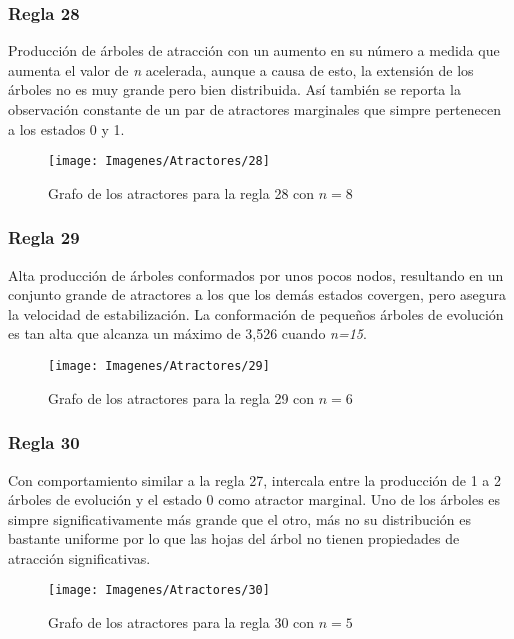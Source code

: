 \documentclass[]{article}
\begin{document}
			
			\newpage
			\subsubsection{Regla 28}
				\justifying	
				Producción de árboles de atracción con un aumento en su número a medida que aumenta el valor de \textit{n} acelerada, aunque a causa de esto, la extensión de los árboles no es muy grande pero bien distribuida. Así también se reporta la observación constante de un par de atractores marginales que simpre pertenecen a los estados 0 y 1.
				
				\hfill\break
				\hfill\break
				\hfill\break
				\begin{figure}[!h]
					\centering
					\texttt{[image: Imagenes/Atractores/28]}
					\caption{Grafo de los atractores para la regla 28 con $n=8$}
					\label{Regla_28}
				\end{figure}
	
			
			\newpage
			\subsubsection{Regla 29}
				\justifying	
				Alta producción de árboles conformados por unos pocos nodos, resultando en un conjunto grande de atractores a los que los demás estados covergen, pero asegura la velocidad de estabilización. La conformación de pequeños árboles de evolución es tan alta que alcanza un máximo de 3,526 cuando \textit{n=15}.
				
				\hfill\break
				\hfill\break
				\hfill\break
				\begin{figure}[!h]
					\centering
					\texttt{[image: Imagenes/Atractores/29]}
					\caption{Grafo de los atractores para la regla 29 con $n=6$}
					\label{Regla_29}
				\end{figure}
	
			
			\newpage
			\subsubsection{Regla 30}
				\justifying	
				Con comportamiento similar a la regla 27, intercala entre la producción de 1 a 2 árboles de evolución y el estado 0 como atractor marginal. Uno de los árboles es simpre significativamente más grande que el otro, más no su distribución es bastante uniforme por lo que las hojas del árbol no tienen propiedades de atracción significativas.
				
				\hfill\break
				\hfill\break
				\hfill\break
				\begin{figure}[!h]
					\centering
					\texttt{[image: Imagenes/Atractores/30]}
					\caption{Grafo de los atractores para la regla 30 con $n=5$}
					\label{Regla_30}
				\end{figure}
				
\end{document}
